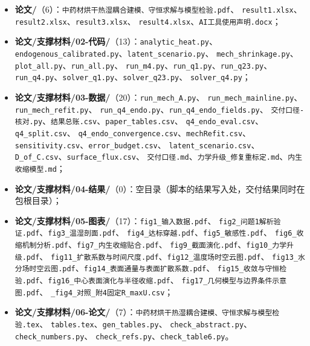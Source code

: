 \documentclass[12pt,a4paper]{ctexart}
\numberwithin{equation}{section}
\begin{document}
{\raggedright
\newcommand{\fsep}{、\allowbreak}
\begin{itemize}
  \item \textbf{论文/}（6）：\texttt{中药材烘干热湿耦合建模、守恒求解与模型检验.pdf}\fsep
        \texttt{result1.xlsx}\fsep \texttt{result2.xlsx}\fsep \texttt{result3.xlsx}\fsep
        \texttt{result4.xlsx}\fsep \texttt{AI工具使用声明.docx}；
  \item \textbf{论文/支撑材料/02-代码/}（13）：\texttt{analytic\_heat.py}\fsep
        \texttt{endogenous\_calibrated.py}\fsep \texttt{latent\_scenario.py}\fsep
        \texttt{mech\_shrinkage.py}\fsep \texttt{plot\_all.py}\fsep \texttt{run\_all.py}\fsep
        \texttt{run\_m4.py}\fsep \texttt{run\_q1.py}\fsep \texttt{run\_q23.py}\fsep
        \texttt{run\_q4.py}\fsep \texttt{solver\_q1.py}\fsep \texttt{solver\_q23.py}\fsep
        \texttt{solver\_q4.py}；
  \item \textbf{论文/支撑材料/03-数据/}（20）：\texttt{run\_mech\_A.py}\fsep
        \texttt{run\_mech\_mainline.py}\fsep \texttt{run\_mech\_refit.py}\fsep
        \texttt{run\_q4\_endo.py}\fsep \texttt{run\_q4\_endo\_fields.py}\fsep
        \texttt{交付口径-核对.py}\fsep \texttt{结果总账.csv}\fsep \texttt{paper\_tables.csv}\fsep
        \texttt{q4\_endo\_eval.csv}\fsep \texttt{q4\_split.csv}\fsep
        \texttt{q4\_endo\_convergence.csv}\fsep \texttt{mechRefit.csv}\fsep
        \texttt{sensitivity.csv}\fsep \texttt{error\_budget.csv}\fsep
        \texttt{latent\_scenario.csv}\fsep \texttt{D\_of\_C.csv}\fsep \texttt{surface\_flux.csv}\fsep
        \texttt{交付口径.md}\fsep \texttt{力学升级\_修复重标定.md}\fsep \texttt{内生收缩模型.md}；
  \item \textbf{论文/支撑材料/04-结果/}（0）：空目录（脚本的结果写入处，交付结果同时在包根目录）；
  \item \textbf{论文/支撑材料/05-图表/}（17）：\texttt{fig1\_输入数据.pdf}\fsep
        \texttt{fig2\_问题1解析验证.pdf}\fsep \texttt{fig3\_温湿剖面.pdf}\fsep
        \texttt{fig4\_达标穿越.pdf}\fsep \texttt{fig5\_敏感性.pdf}\fsep
        \texttt{fig6\_收缩机制分析.pdf}\fsep \texttt{fig7\_内生收缩贴合.pdf}\fsep
        \texttt{fig9\_截面演化.pdf}\fsep \texttt{fig10\_力学升级.pdf}\fsep
        \texttt{fig11\_扩散系数与时间尺度.pdf}\fsep \texttt{fig12\_温度场时空云图.pdf}\fsep
        \texttt{fig13\_水分场时空云图.pdf}\fsep \texttt{fig14\_表面通量与表面扩散系数.pdf}\fsep
        \texttt{fig15\_收敛与守恒检验.pdf}\fsep \texttt{fig16\_中心表面演化与半径收缩.pdf}\fsep
        \texttt{fig17\_几何模型与边界条件示意图.pdf}\fsep
        \texttt{\_fig4\_对照\_附4固定R\_maxU.csv}；
  \item \textbf{论文/支撑材料/06-论文/}（7）：\texttt{中药材烘干热湿耦合建模、守恒求解与模型检验.tex}\fsep
        \texttt{tables.tex}\fsep \texttt{gen\_tables.py}\fsep
        \texttt{check\_abstract.py}\fsep \texttt{check\_numbers.py}\fsep
        \texttt{check\_refs.py}\fsep \texttt{check\_table6.py}。
\end{itemize}}
\end{document}
